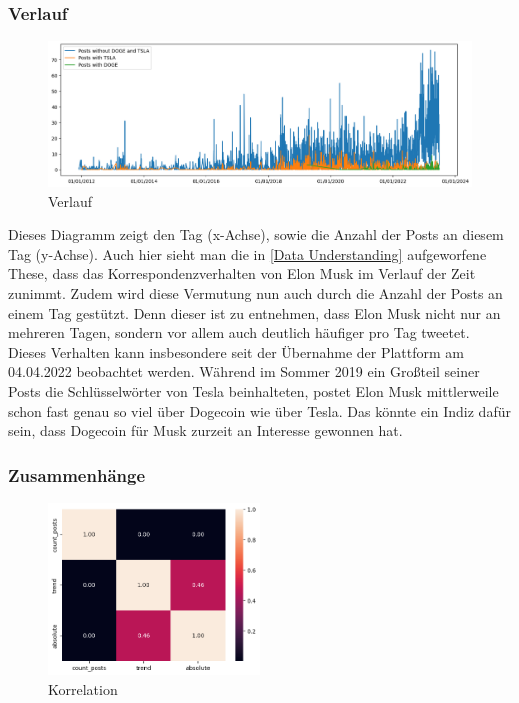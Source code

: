 \documentclass{article}
\begin{document}
\subsubsection{Verlauf} \label{Verlauf}
\begin{figure}[!htb]
  	\includegraphics[width=\textwidth, center]{../imgs/Verlauf.png}
 	\caption{Verlauf}
 	\label{fig:FigVerlauf}
\end{figure}
Dieses Diagramm zeigt den Tag (x-Achse), sowie die Anzahl der Posts an diesem Tag (y-Achse). Auch hier sieht man die in \ref{Data Understanding} aufgeworfene These, dass das Korrespondenzverhalten von Elon Musk im Verlauf der Zeit zunimmt.
Zudem wird diese Vermutung nun auch durch die Anzahl der Posts an einem Tag gestützt.
Denn dieser ist zu entnehmen, dass Elon Musk nicht nur an mehreren Tagen, sondern vor allem auch deutlich häufiger pro Tag tweetet.
Dieses Verhalten kann insbesondere seit der Übernahme der Plattform am 04.04.2022 beobachtet werden.
Während im Sommer 2019 ein Großteil seiner Posts die Schlüsselwörter von Tesla beinhalteten, postet Elon Musk mittlerweile schon fast genau so viel über Dogecoin wie über Tesla. Das könnte ein Indiz dafür sein, dass Dogecoin für Musk zurzeit an Interesse gewonnen hat.

\subsubsection{Zusammenhänge} \label{Zusammenhänge}
\begin{figure}[!htb]
    		\includegraphics[width=0.5\textwidth, center]{../imgs/Korrelation.png}
    		\caption{Korrelation}
    		\label{fig:Korrelation}
\end{figure}
\end{document}
